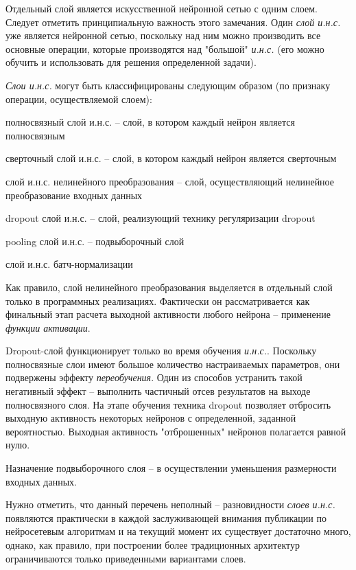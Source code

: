 Отдельный слой является искусственной нейронной сетью с одним слоем.
Следует отметить принципиальную важность этого замечания. Один \textit{слой и.н.с.}  уже является нейронной сетью, поскольку над ним можно производить все основные операции, которые производятся над "большой" \textit{и.н.с.} (его можно обучить и использовать для решения определенной задачи).

\textit{Слои и.н.с.} могут быть классифицированы следующим образом (по признаку операции, осуществляемой слоем):
\begin{textitemize}
	\item полносвязный слой и.н.с. -- слой, в котором каждый нейрон является полносвязным
	\item сверточный слой и.н.с. -- слой, в котором каждый нейрон является сверточным
	\item слой и.н.с. нелинейного преобразования -- слой, осуществляющий нелинейное преобразование входных данных
	\item dropout слой и.н.с. -- слой, реализующий технику регуляризации dropout
	\item pooling слой и.н.с. -- подвыборочный слой
	\item слой и.н.с. батч-нормализации
\end{textitemize}

Как правило, слой нелинейного преобразования выделяется в отдельный слой только в программных реализациях. Фактически он рассматривается как финальный этап расчета выходной активности любого нейрона -- применение \textit{функции активации}.

Dropout-слой функционирует только во время обучения \textit{и.н.с.}. Поскольку полносвязные слои имеют большое количество настраиваемых параметров, они подвержены эффекту \textit{переобучения}. Один из способов устранить такой негативный эффект -- выполнить частичный отсев результатов на выходе полносвязного слоя. На этапе обучения техника dropout позволяет отбросить выходную активность некоторых нейронов с определенной, заданной вероятностью. Выходная активность "отброшенных" нейронов полагается равной нулю.

Назначение подвыборочного слоя -- в осуществлении уменьшения размерности входных данных.

Нужно отметить, что данный перечень неполный -- разновидности \textit{слоев и.н.с.} появляются практически в каждой заслуживающей внимания публикации по нейросетевым алгоритмам и на текущий момент их существует достаточно много, однако, как правило, при построении более традиционных архитектур ограничиваются только приведенными вариантами слоев.

